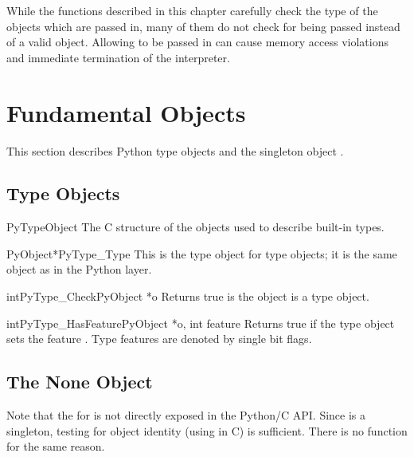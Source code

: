 \documentclass{manual}
\begin{document}
While the functions described in this chapter carefully check the type
of the objects which are passed in, many of them do not check for
\NULL{} being passed instead of a valid object.  Allowing \NULL{} to
be passed in can cause memory access violations and immediate
termination of the interpreter.


\section{Fundamental Objects \label{fundamental}}

This section describes Python type objects and the singleton object 
.


\subsection{Type Objects \label{typeObjects}}

\begin{ctypedesc}{PyTypeObject}
The C structure of the objects used to describe built-in types.
\end{ctypedesc}

\begin{cvardesc}{PyObject*}{PyType_Type}
This is the type object for type objects; it is the same object as
 in the Python layer.
\end{cvardesc}

\begin{cfuncdesc}{int}{PyType_Check}{PyObject *o}
Returns true is the object  is a type object.
\end{cfuncdesc}

\begin{cfuncdesc}{int}{PyType_HasFeature}{PyObject *o, int feature}
Returns true if the type object  sets the feature
.  Type features are denoted by single bit flags.
\end{cfuncdesc}


\subsection{The None Object \label{noneObject}}

Note that the  for  is not directly
exposed in the Python/C API.  Since  is a singleton,
testing for object identity (using \samp{==} in C) is sufficient.
There is no  function for the same reason.
\end{document}
